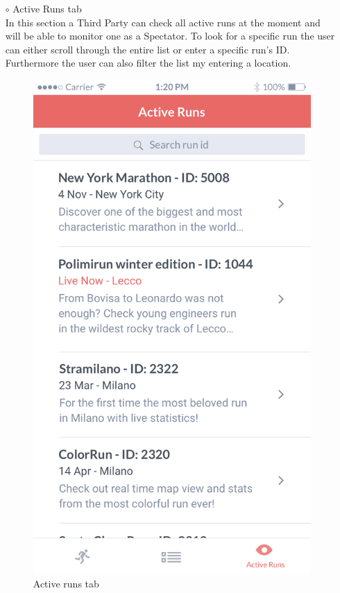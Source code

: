 \documentclass[titlepage]{article}
\begin{document}
\begin{itemize}
\begin{itemize}
\begin{itemize}
					\item[$\circ$] Active Runs tab \\
					In this section a Third Party can check all active runs at the moment and will be able to monitor one as a Spectator. To look for a specific run the user can either scroll through the entire list or enter a specific run’s ID. Furthermore the user can also filter the list my entering a location.\\
					\begin{figure}[H]
						\center
  						\includegraphics[width=0.5\columnwidth]{Mockup/mockupActiveRuns.png}
  						\caption{Active runs tab}
 					 	\label{fig:Active runs}
					\end{figure}


\end{itemize}
\end{itemize}
\end{itemize}
\end{document}
